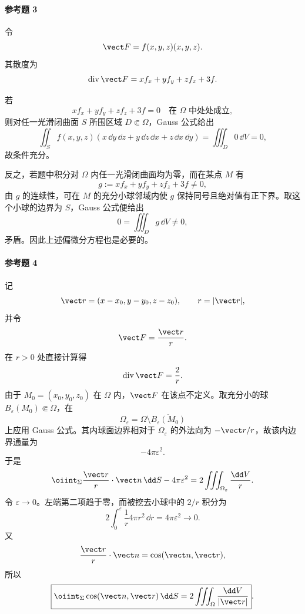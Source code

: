 \paragraph{参考题 3}
\begin{xsolution}
令
\[
  \vect F=f(x,y,z)(x,y,z).
\]
其散度为
\[
  \operatorname{div}\vect F
  =xf_x+yf_y+zf_z+3f.
\]

若
\[
  \boxed{xf_x+yf_y+zf_z+3f=0\quad\text{在 }\Omega\text{ 中处处成立}},
\]
则对任一光滑闭曲面 $S$ 所围区域 $D\Subset\Omega$，Gauss 公式给出
\[
  \iint_S f(x,y,z)(x\,\dd y\,\dd z+y\,\dd z\,\dd x+z\,\dd x\,\dd y)
  =\iiint_D0\,\dd V=0,
\]
故条件充分。

反之，若题中积分对 $\Omega$ 内任一光滑闭曲面均为零，而在某点 $M$ 有
\[
  g:=xf_x+yf_y+zf_z+3f\ne0,
\]
由 $g$ 的连续性，可在 $M$ 的充分小球邻域内使 $g$ 保持同号且绝对值有正下界。取这个小球的边界为 $S$，Gauss 公式便给出
\[
  0=\iiint_Dg\,\dd V\ne0,
\]
矛盾。因此上述偏微分方程也是必要的。
\end{xsolution}

\paragraph{参考题 4}
\begin{xsolution}
记
\[
  \vect r=(x-x_0,y-y_0,z-z_0),
  \qquad r=|\vect r|,
\]
并令
\[
  \vect F=\frac{\vect r}{r}.
\]
在 $r>0$ 处直接计算得
\[
  \operatorname{div}\vect F=\frac2r.
\]
由于 $M_0=(x_0,y_0,z_0)$ 在 $\Omega$ 内，$\vect F$ 在该点不定义。取充分小的球 $B_\varepsilon(M_0)\Subset\Omega$，在
\[
  \Omega_\varepsilon=\Omega\setminus\overline{B_\varepsilon(M_0)}
\]
上应用 Gauss 公式。其内球面边界相对于 $\Omega_\varepsilon$ 的外法向为 $-\vect r/r$，故该内边界通量为
\[
  -4\pi\varepsilon^2.
\]
于是
\[
  \oiint_\Sigma\frac{\vect r}{r}\cdot\vect n\,\dd S-4\pi\varepsilon^2
  =2\iiint_{\Omega_\varepsilon}\frac{\dd V}{r}.
\]
令 $\varepsilon\to0$。左端第二项趋于零，而被挖去小球中的 $2/r$ 积分为
\[
  2\int_0^\varepsilon\frac1r4\pi r^2\,\dd r=4\pi\varepsilon^2\to0.
\]
又
\[
  \frac{\vect r}{r}\cdot\vect n=\cos(\vect n,\vect r),
\]
所以
\[
  \boxed{\oiint_\Sigma\cos(\vect n,\vect r)\,\dd S
  =2\iiint_\Omega\frac{\dd V}{|\vect r|}}.
\]
\end{xsolution}

